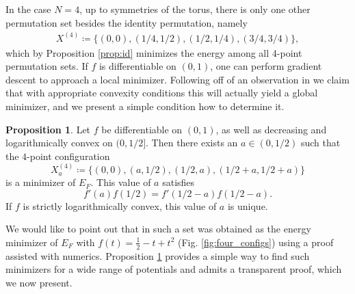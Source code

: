 \documentclass[a4paper,12pt]{article}
\numberwithin{equation}{section}
\theoremstyle{definition}
\newtheorem{prop}[thm]{Proposition}
\begin{document}
In the case $N=4$, up to symmetries of the torus, there is only one other permutation set besides the identity permutation, namely
\begin{align} \label{opt_4_perm}
    X^{(4)} \coloneqq \{(0,0),(1/4,1/2),(1/2,1/4),(3/4,3/4)\},
\end{align}
which by Proposition \ref{prop:id} minimizes the energy among all $4$-point permutation sets. If $f$ is differentiable on $(0, 1)$, %
one can perform gradient descent to approach a local minimizer. Following off of an observation in \cite{HO16} we claim that with appropriate convexity conditions this will actually yield a global minimizer, and we present a simple condition how to determine it.

\begin{prop}\label{prop:n4}
    Let  $f$ be differentiable on $(0,1)$, as well as decreasing   and logarithmically convex on $(0,1/2]$. Then there exists an $a\in(0,1/2)$ such that the $4$-point configuration $$X_a^{(4)}\coloneqq\{(0,0),(a,1/2),(1/2,a),(1/2+a,1/2+a)\}$$  is a  minimizer of $E_F$. This value of $a$ satisfies \begin{equation}\label{eq:n4_condition}
        f'(a)f(1/2)=f'(1/2-a)f(1/2-a).
    \end{equation}
    If $f$ is strictly logarithmically convex, this value of $a$ is unique.
\end{prop}

We would like to point out that in \cite{HO16}  such a set was obtained as the energy minimizer of $E_F$ with  $f(t) = \frac12 - t + t^2$ (Fig. \ref{fig:four_configs}) using a proof assisted with numerics. Proposition \ref{prop:n4} provides a simple way to find such minimizers for a wide range of potentials and admits a transparent proof, which we now present. 
\end{document}
